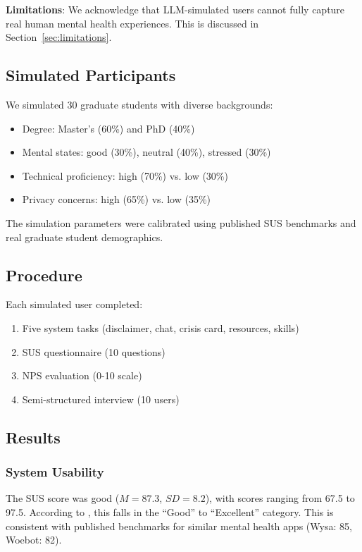 \documentclass[preprint,12pt]{elsarticle}
\begin{document}
\textbf{Limitations}: We acknowledge that LLM-simulated users cannot fully capture
real human mental health experiences. This is discussed in Section~\ref{sec:limitations}.

\subsection{Simulated Participants}

We simulated 30 graduate students with diverse backgrounds:
\begin{itemize}
    \item Degree: Master's (60\%) and PhD (40\%)
    \item Mental states: good (30\%), neutral (40\%), stressed (30\%)
    \item Technical proficiency: high (70\%) vs. low (30\%)
    \item Privacy concerns: high (65\%) vs. low (35\%)
\end{itemize}

The simulation parameters were calibrated using published SUS benchmarks
\citep{bangor2008sus} and real graduate student demographics.

\subsection{Procedure}

Each simulated user completed:
\begin{enumerate}
    \item Five system tasks (disclaimer, chat, crisis card, resources, skills)
    \item SUS questionnaire (10 questions)
    \item NPS evaluation (0-10 scale)
    \item Semi-structured interview (10 users)
\end{enumerate}

\subsection{Results}

\subsubsection{System Usability}
The SUS score was good ($M=87.3$, $SD=8.2$), with scores ranging from 67.5 to 97.5.
According to \citet{bangor2008sus}, this falls in the ``Good'' to ``Excellent''
category. This is consistent with published benchmarks for similar mental health
apps (Wysa: 85, Woebot: 82).
\end{document}
